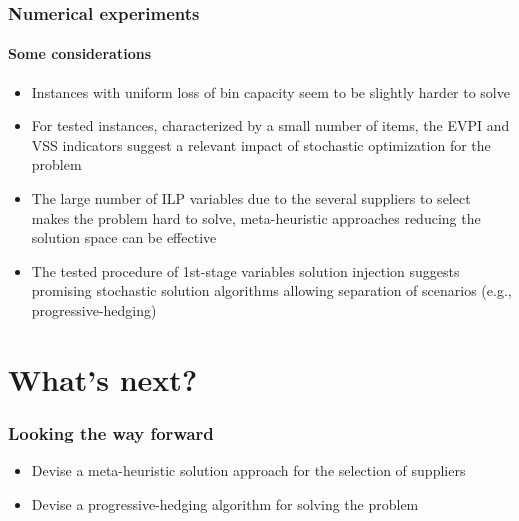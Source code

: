\documentclass[9pt,xcolor={dvipsnames}]{beamer}
\begin{document}
\begin{frame}%
	\frametitle{Numerical experiments}
	\framesubtitle{Some considerations}	
	\begin{itemize}
		\item<1-> Instances with uniform loss of bin capacity seem to be slightly harder to solve
		\bigskip
		\item<2-> For tested instances, characterized by a small number of items, the EVPI and VSS indicators suggest a relevant impact of stochastic optimization for the problem
		\bigskip
		\item<3-> The large number of ILP variables due to the several suppliers to select makes the problem hard to solve, meta-heuristic approaches reducing the solution space can be effective
		\bigskip
		\item<4-> The tested procedure of 1st-stage variables solution injection suggests promising stochastic solution algorithms allowing separation of scenarios (e.g., progressive-hedging)
	\end{itemize}
\end{frame}

\section {What's next?}
\begin{frame}%
	\frametitle{Looking the way forward}
	\begin{itemize}
		\item<1-> Devise a meta-heuristic solution approach for the selection of suppliers 
		\bigskip
		\item<2-> Devise a progressive-hedging algorithm for solving the problem
	\end{itemize}
\end{frame}
\end{document}
